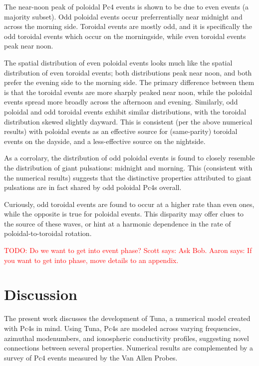 \documentclass{article}
\newcommand{\todo}[1]{ \textcolor{red}{TODO: #1} }
\begin{document}
The near-noon peak of poloidal Pc4 events is shown to be due to even events (a majority subset). Odd poloidal events occur preferrentially near midnight and across the morning side. Toroidal events are mostly odd, and it is specifically the odd toroidal events which occur on the morningside, while even toroidal events peak near noon.

The spatial distribution of even poloidal events looks much like the spatial distribution of even toroidal events; both distributions peak near noon, and both prefer the evening side to the morning side. The primary difference between them is that the toroidal events are more sharply peaked near noon, while the poloidal events spread more broadly across the afternoon and evening. Similarly, odd poloidal and odd toroidal events exhibit similar distributions, with the toroidal distribution skewed slightly dayward. This is consistent (per the above numerical results) with poloidal events as an effective source for (same-parity) toroidal events on the dayside, and a less-effective source on the nightside.

As a corrolary, the distribution of odd poloidal events is found to closely resemble the distribution of giant pulsations: midnight and morning. This (consistent with the numerical results) suggests that the distinctive properties attributed to giant pulsations are in fact shared by odd poloidal Pc4s overall.

Curiously, odd toroidal events are found to occur at a higher rate than even ones, while the opposite is true for poloidal events. This disparity may offer clues to the source of these waves, or hint at a harmonic dependence in the rate of poloidal-to-toroidal rotation.

\todo{Do we want to get into event phase? Scott says: Ask Bob. Aaron says: If you want to get into phase, move details to an appendix.}


\section{Discussion}

The present work discusses the development of Tuna, a numerical model created with Pc4s in mind. Using Tuna, Pc4s are modeled across varying frequencies, azimuthal modenumbers, and ionospheric conductivity profiles, suggesting novel connections between several properties. Numerical results are complemented by a survey of Pc4 events measured by the Van Allen Probes.
\end{document}
